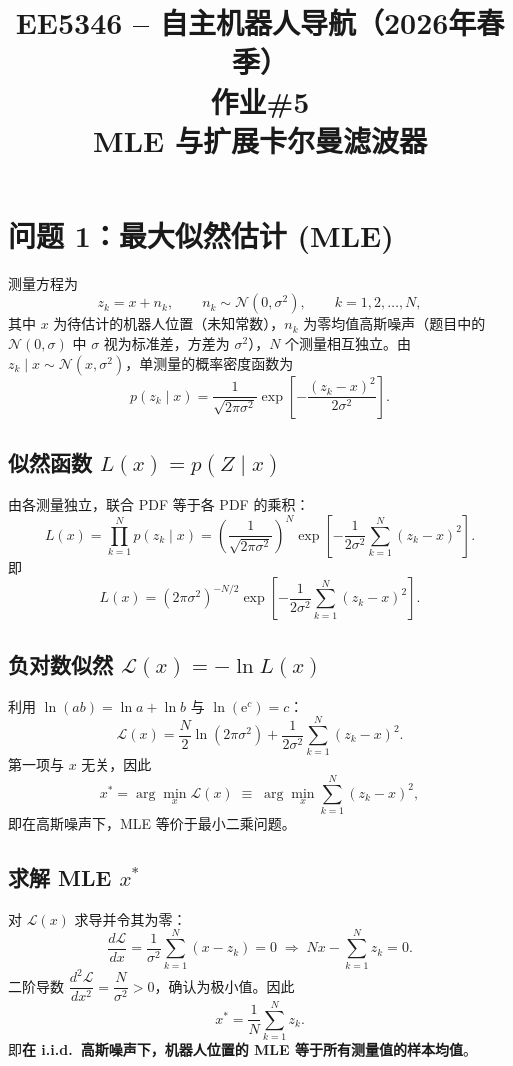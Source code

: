 \documentclass[12pt]{article}
\begin{document}
\title{EE5346 -- 自主机器人导航（2026年春季）\\ 作业\#5\\ MLE 与扩展卡尔曼滤波器}
\author{}
\date{}
\maketitle

\section*{问题 1：最大似然估计 (MLE)}

测量方程为
\[
z_k = x + n_k,\qquad n_k \sim \mathcal{N}(0,\sigma^2),\qquad k=1,2,\dots,N,
\]
其中 $x$ 为待估计的机器人位置（未知常数），$n_k$ 为零均值高斯噪声（题目中的 $\mathcal{N}(0,\sigma)$ 中 $\sigma$ 视为标准差，方差为 $\sigma^2$），$N$ 个测量相互独立。由 $z_k\mid x \sim \mathcal{N}(x,\sigma^2)$，单测量的概率密度函数为
\[
p(z_k\mid x)=\frac{1}{\sqrt{2\pi\sigma^2}}\exp\!\left[-\frac{(z_k-x)^2}{2\sigma^2}\right].
\]

\subsection*{似然函数 $L(x)=p(Z\mid x)$}

由各测量独立，联合 PDF 等于各 PDF 的乘积：
\[
L(x)=\prod_{k=1}^{N}p(z_k\mid x)
=\left(\frac{1}{\sqrt{2\pi\sigma^2}}\right)^{\!N}
\exp\!\left[-\frac{1}{2\sigma^2}\sum_{k=1}^{N}(z_k-x)^2\right].
\]
即
\[
\boxed{\;
L(x)=(2\pi\sigma^2)^{-N/2}\exp\!\left[-\frac{1}{2\sigma^2}\sum_{k=1}^{N}(z_k-x)^2\right].
\;}
\]

\subsection*{负对数似然 $\mathcal{L}(x)=-\ln L(x)$}

利用 $\ln(ab)=\ln a+\ln b$ 与 $\ln(\mathrm{e}^c)=c$：
\[
\boxed{\;
\mathcal{L}(x)=\frac{N}{2}\ln(2\pi\sigma^2)+\frac{1}{2\sigma^2}\sum_{k=1}^{N}(z_k-x)^2.
\;}
\]
第一项与 $x$ 无关，因此
\[
x^{*}=\arg\min_{x}\mathcal{L}(x)\;\equiv\;\arg\min_{x}\sum_{k=1}^{N}(z_k-x)^2,
\]
即在高斯噪声下，MLE 等价于最小二乘问题。

\subsection*{求解 MLE $x^{*}$}

对 $\mathcal{L}(x)$ 求导并令其为零：
\[
\frac{d\mathcal{L}}{dx}=\frac{1}{\sigma^2}\sum_{k=1}^{N}(x-z_k)=0
\;\Longrightarrow\;
Nx-\sum_{k=1}^{N}z_k=0.
\]
二阶导数 $\dfrac{d^{2}\mathcal{L}}{dx^{2}}=\dfrac{N}{\sigma^{2}}>0$，确认为极小值。因此
\[
\boxed{\;x^{*}=\frac{1}{N}\sum_{k=1}^{N}z_k.\;}
\]
即\textbf{在 i.i.d.\ 高斯噪声下，机器人位置的 MLE 等于所有测量值的样本均值}。
\end{document}

